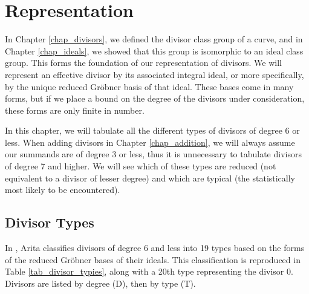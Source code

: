 
\section{Representation}
\label{chap_representation}

In Chapter \ref{chap_divisors}, we defined the divisor class group of a curve,
and in Chapter \ref{chap_ideals}, we showed that this group is isomorphic to an ideal class group.
This forms the foundation of our representation of divisors.
We will represent an effective divisor by its associated integral ideal,
or more specifically, by the unique reduced Gr\"obner basis of that ideal.
These bases come in many forms, but if we place a bound on the degree of the divisors under consideration,
these forms are only finite in number.

In this chapter, we will tabulate all the different types of divisors of degree 6 or less.
When adding divisors in Chapter \ref{chap_addition},
we will always assume our summands are of degree 3 or less,
thus it is unnecessary to tabulate divisors of degree 7 and higher.
We will see which of these types are reduced (not equivalent to a divisor of lesser degree)
and which are typical (the statistically most likely to be encountered).




\subsection{Divisor Types}

In \cite{arita05-2}, Arita classifies divisors of degree 6 and less into 19 types
based on the forms of the reduced Gr\"obner bases of their ideals.
This classification is reproduced in Table \ref{tab_divisor_typies},
along with a 20th type representing the divisor 0.
Divisors are listed by degree (D), then by type (T).

